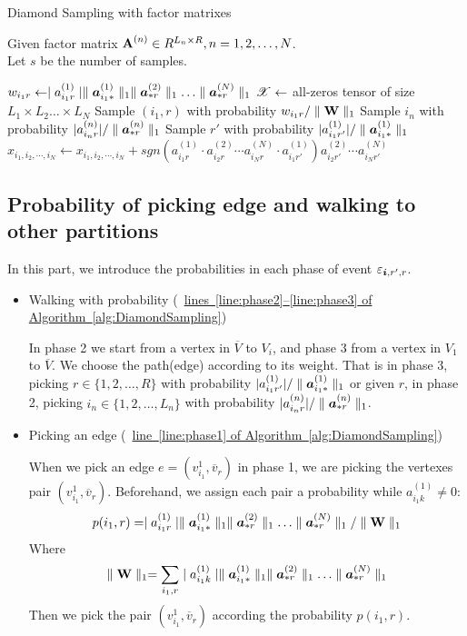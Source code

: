 \documentclass{article}
\newcommand{\Sca}[3]{{#1}^{(#2)}_{i_#2#3}}%
\newcommand{\T}[1]{\boldsymbol{\mathscr{\MakeUppercase{#1}}}}%
\newcommand{\V}[1]{{\bm{{\MakeLowercase{#1}}}}}%
\newcommand{\Varow}[1]{\V{a}^{(#1)}_{i_#1*}}
\newcommand{\Vacol}[1]{\V{a}^{(#1)}_{*r}}
\newcommand{\M}[1]{{\bm{\mathbf{\MakeUppercase{#1}}}}}%
\newcommand{\norm}[2]{\parallel#1\parallel_{#2}}
\newcommand{\AlgLine}[2]{\hyperref[alg:#1]{line~\ref*{line:#2} of Algorithm~\ref*{alg:#1}}}
\newcommand{\AlgLines}[3]{\hyperref[alg:#1]{lines~\ref*{line:#2}--\ref*{line:#3} of Algorithm~\ref*{alg:#1}}}
\begin{document}
\begin{algorithm}[t]
    \caption{Diamond Sampling with factor matrixes}
    \label{alg:DiamondSampling}
    Given factor matrix $\M{A}^{(n)}\in R^{L_n\times R}, n = 1,2,\ldots,N$.\\
    Let $s$ be the number of samples.
    \begin{algorithmic}[1]
    \For{all $\Sca{a}{1}{r} \neq 0$}
    \State $w_{i_1r} \leftarrow \mid \Sca{a}{1}{r}\mid
    \norm{\Varow{1}}{1}\norm{\Vacol{2}}{1}\ldots\norm{\Vacol{N}}{1} $
    \EndFor
    \State $\T{X} \leftarrow$ all-zeros tensor of size
    $L_1\times L_2\ldots\times L_N$
    \State Sample $(i_1,r)$ with probability $w_{i_1r}/\norm{\M{W}}{1}$        \label{line:phase1}
    \State Sample $i_n$ with probability $|\Sca{a}{n}{r}|/\norm{\Vacol{n}}{1}$
    \label{line:phase2}
    \EndFor
    \State Sample $r'$ with probability $|\Sca{a}{1}{r'}|/\norm{\Varow{1}}{1}$
    \label{line:phase3}
    \State $x_{i_1,i_2,\cdots,i_N}\leftarrow x_{i_1,i_2,\cdots,i_N} +
    sgn(\Sca{a}{1}{r}\cdot\Sca{a}{2}{r}\cdots\Sca{a}{N}{r}\cdot\Sca{a}{1}{r'})
    \Sca{a}{2}{r'}\cdots\Sca{a}{N}{r'}$
    \label{line:scoring}
    \EndFor
    \end{algorithmic}
\end{algorithm}

\subsection{Probability of picking edge and walking to other partitions}

In this part, we introduce the probabilities in each phase of event $\varepsilon_{\V{i},r',r}$.

\begin{itemize}
  \item Walking with probability  (~\AlgLines{DiamondSampling}{phase2}{phase3})

  In phase 2 we start from a vertex in $\overline{V}$ to $V_i$, and phase 3 from a vertex in $V_1$ to $\overline{V}$. We choose the path(edge) according to its weight. That is in phase 3, picking $r\in\{1,2,\ldots,R\}$ with probability $|\Sca{a}{1}{r'}|/\norm{\Varow{1}}{1}$ or given $r$, in phase 2, picking $i_n\in\{1,2,\ldots,L_n\}$ with probability $|\Sca{a}{n}{r}|/\norm{\Vacol{n}}{1}$.

  \item Picking an edge (~\AlgLine{DiamondSampling}{phase1})

  When we pick an edge $e=(v^1_{i_1},\overline{v}_r)$ in phase 1, we are picking the vertexes pair $(v^1_{i_1},\overline{v}_r)$. Beforehand, we assign each pair a probability while $ \Sca{a}{1}{k} \neq 0 $:
  \[
    p(i_1,r) = \mid\Sca{a}{1}{r}\mid \norm{\Varow{1}}{1} \norm{\Vacol{2}}{1} \ldots \norm{\Vacol{N}}{1} / \norm{\M{W}}{1}
  \]
  Where
  \[
    \norm{\M{W}}{1} = \sum_{i_1,r}\mid \Sca{a}{1}{k}\mid \norm{\Varow{1}}{1} \norm{\Vacol{2}}{1} \ldots \norm{\Vacol{N}}{1}
  \]
  Then we pick the pair $(v^1_{i_1},\overline{v}_r)$ according the probability $p(i_1,r)$.
\end{itemize}
\end{document}
